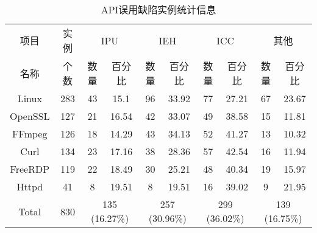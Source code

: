 \begin{table}[b]
	\centering
	\begin{minipage}[t]{\linewidth} %
		\caption{API误用缺陷实例统计信息}
		\label{tab:2-3-root-causes}
		\begin{tabular}{@{\extracolsep{3pt}}cccccccccc@{}}
			\hline
			项目 & 实例 & \multicolumn{2}{c}{IPU}& \multicolumn{2}{c}{IEH}& \multicolumn{2}{c}{ICC}& \multicolumn{2}{c}{其他}\\
			\cline{3-4} \cline{5-6} \cline{7-8} \cline{9-10}
		    名称	& 个数 & 数量 & 百分比 & 数量& 百分比 & 数量& 百分比& 数量& 百分比 \\
			\hline
			Linux  & 283 & 43 & 15.1 & {96} & {33.92} & 77 & 27.21 & 67 & 23.67 \\
			OpenSSL  & 127 & 21 & 16.54 & 42 & 33.07 & {49} & {38.58} & 15 & 11.81 \\ 
			FFmpeg  & 126  &  18 & 14.29 & 43 & 34.13 & 52 & 41.27 & 13 & 10.32 \\
			Curl  & 134   & 23 & 17.16 & 38 & 28.36 & 57 & 42.54 & 16 & 11.94 \\ 
			FreeRDP   & 119 & 22 & 18.49 & 30 & 25.21 & 48 & 40.34 & 19 & 15.97 \\ 
			Httpd  & 41 & 8 & 19.51 & 8 & 19.51 & 16 & 39.02 & 9 & 21.95 \\ 
			\hline
			Total  & 830 & \multicolumn{2}{c}{135 (16.27\%)} & \multicolumn{2}{c}{257 (30.96\%)} & \multicolumn{2}{c}{299 (36.02\%)} & \multicolumn{2}{c}{139 (16.75\%)}\\ 
			\hline
		\end{tabular}
	\end{minipage}
\end{table}
